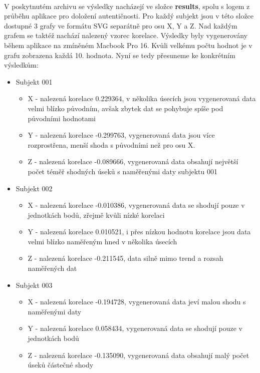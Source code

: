 \documentclass[12pt, a4paper]{article}
\begin{document}
\paragraph{} V poskytnutém archivu se výsledky nacházejí ve složce \textbf{results}, spolu s logem z průběhu aplikace pro doložení autentičnosti.
Pro každý subjekt jsou v této složce dostupné 3 grafy ve formátu SVG separátně pro osu X, Y a Z. 
Nad každým grafem se taktéž nachází nalezený vzorec korelace.
Výsledky byly vygenerovány během aplikace na zmíněném Macbook Pro 16.
Kvůli velkému počtu hodnot je v grafu zobrazena každá 10. hodnota.
Nyní se tedy přesuneme ke konkrétním výsledkům:

\begin{itemize}
  \item Subjekt 001 
      \begin{itemize}
        \item X - nalezená korelace 0.229364, v několika úsecích jsou vygenerovaná data velmi blízko původním, avšak zbytek dat se pohybuje spíše pod původními hodnotami
        \item Y - nalezená korelace -0.299763, vygenerovaná data jsou více rozprostřena, menší shoda s původními než pro osu X.
        \item Z - nalezená korelace -0.089666, vygenerovaná data obsahují největší počet téměř shodných úseků s naměřenými daty subjektu 001 
      \end{itemize}
  \item Subjekt 002 
      \begin{itemize}
        \item X - nalezená korelace -0.010386, vygenerovaná data se shodují pouze v jednotkách bodů, zřejmě kvůli nízké korelaci 
        \item Y - nalezená korelace 0.010521, i přes nízkou hodnotu korelace jsou data velmi blízko naměřeným hned v několika úsecích
        \item Z - nalezená korelace -0.211545, data silně mimo trend a rozsah naměřených dat
      \end{itemize}
  \item Subjekt 003 
      \begin{itemize}
        \item X - nalezená korelace -0.194728, vygenerovaná data jeví malou shodu s naměřenými daty
        \item Y - nalezená korelace 0.058434, vygenerovaná data se shodují pouze v jednotkách bodů 
        \item Z - nalezená korelace -0.135090, vygenerovaná data obsahují malý počet úseků částečné shody

\end{itemize}
\end{itemize}
\end{document}
